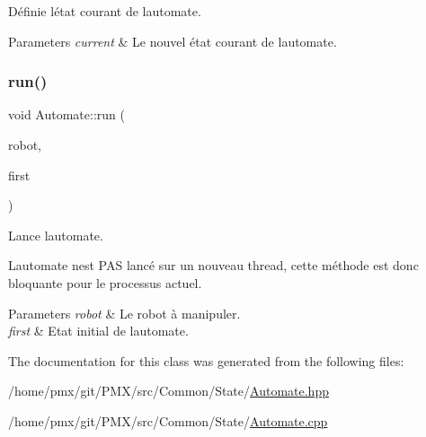 Définie l\textquotesingle{}état courant de l\textquotesingle{}automate. 


\begin{DoxyParams}{Parameters}
{\em current} & Le nouvel état courant de l\textquotesingle{}automate. \\
\hline
\end{DoxyParams}
\mbox{\label{classAutomate_a1df5d3b6c5abc353b347f4defcfde4e9}} 
\subsubsection{\texorpdfstring{run()}{run()}}
{\footnotesize\ttfamily void Automate\+::run (\begin{DoxyParamCaption}\item[{\hyperlink{classRobot}{Robot} \&}]{robot,  }\item[{\hyperlink{classIAutomateState}{I\+Automate\+State} $\ast$}]{first }\end{DoxyParamCaption})}



Lance l\textquotesingle{}automate. 

L\textquotesingle{}automate n\textquotesingle{}est P\+AS lancé sur un nouveau thread, cette méthode est donc bloquante pour le processus actuel.


\begin{DoxyParams}{Parameters}
{\em robot} & Le robot à manipuler. \\
\hline
{\em first} & Etat initial de l\textquotesingle{}automate. \\
\hline
\end{DoxyParams}


The documentation for this class was generated from the following files\+:\begin{DoxyCompactItemize}
\item 
/home/pmx/git/\+P\+M\+X/src/\+Common/\+State/\hyperlink{Automate_8hpp}{Automate.\+hpp}\item 
/home/pmx/git/\+P\+M\+X/src/\+Common/\+State/\hyperlink{Automate_8cpp}{Automate.\+cpp}\end{DoxyCompactItemize}
